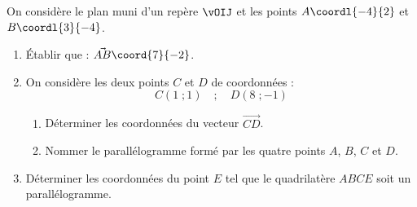 \begin{exo}{}
	On considère le plan muni d'un repère $\vOIJ$ et les points $A\coordl{-4}{2}$ et $B\coordl{3}{-4}$.
	\begin{enumerate}
		\item Établir que : $\vec{AB}\coord{7}{-2}$.
		\item On considère les deux points $C$ et $D$ de coordonnées :
		      \vspace*{-2mm}\[ C(1\;; 1) \quad ; \quad D(8\;; -1) \]
		      \begin{enumerate}
			      \vspace*{-2mm}
			      \item Déterminer les coordonnées du vecteur $\vec{CD}$.
			      \item Nommer le parallélogramme formé par les quatre points $A$, $B$, $C$ et $D$.
		      \end{enumerate}
		\item Déterminer les coordonnées du point $E$ tel que le quadrilatère $ABCE$ soit un parallélogramme.
	\end{enumerate}
\end{exo}

